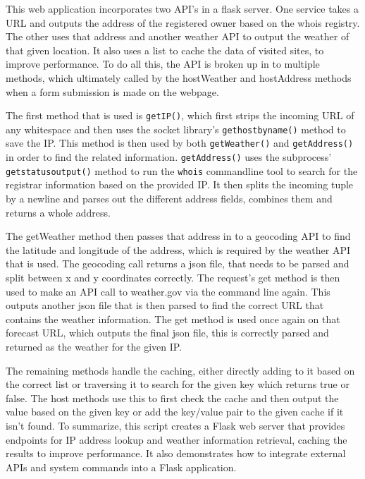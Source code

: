 	This web application incorporates two API's in a flask server. One service takes a URL and outputs the address of the registered owner based on the whois \cite{rfc3912} registry. The other uses that address and another weather API \cite{weather2009national,} to output the weather of that given location. It also uses a list to cache the data of visited sites, to improve performance. To do all this, the API is broken up in to multiple methods, which ultimately called by the hostWeather and hostAddress methods when a form submission is made on the webpage.
	
	The first method that is used is \verb+getIP()+, which first strips the incoming URL of any whitespace and then uses the socket library's \verb+gethostbyname()+ method to save the IP. This method is then used by both \verb+getWeather()+ and \verb+getAddress()+ in order to find the related information. \verb+getAddress()+ uses the subprocess' \verb+getstatusoutput()+ method to run the \verb+whois+ commandline tool to search for the registrar information based on the provided IP. It then splits the incoming tuple by a newline and parses out the different address fields, combines them and returns a whole address. 
	
	The getWeather method then passes that address in to a geocoding API to find the latitude and longitude of the address, which is required by the weather API that is used. The geocoding call returns a json file, that needs to be parsed and split between x and y coordinates correctly. The request's get method is then used to make an API call to weather.gov \cite{weather2009national} via the command line again. This outputs another json file that is then parsed to find the correct URL that contains the weather information. The get method is used once again on that forecast URL, which outputs the final json file, this is correctly parsed and returned as the weather for the given IP.

	The remaining methods handle the caching, either directly adding to it based on the correct list or traversing it to search for the given key which returns true or false. The host methods use this to first check the cache and then output the value based on the given key or add the key/value pair to the given cache if it isn't found. To summarize, this script creates a Flask web server that provides endpoints for IP address lookup and weather information retrieval, caching the results to improve performance. It also demonstrates how to integrate external APIs and system commands into a Flask application.

